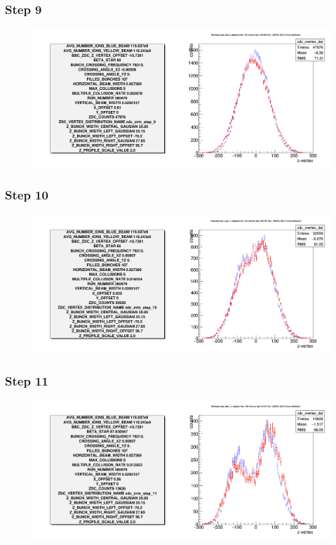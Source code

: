 \begin{frame}
  \frametitle{Step 9}
  \begin{figure}
    \includegraphics[width=\linewidth]{"./figures/tuned_simulation_step_9"}
    \label{fig:step_9}
  \end{figure}
\end{frame}

\begin{frame}
  \frametitle{Step 10}
  \begin{figure}
    \includegraphics[width=\linewidth]{"./figures/tuned_simulation_step_10"}
    \label{fig:step_10}
  \end{figure}
\end{frame}

\begin{frame}
  \frametitle{Step 11}
  \begin{figure}
    \includegraphics[width=\linewidth]{"./figures/tuned_simulation_step_11"}
    \label{fig:step_11}
  \end{figure}
\end{frame}

